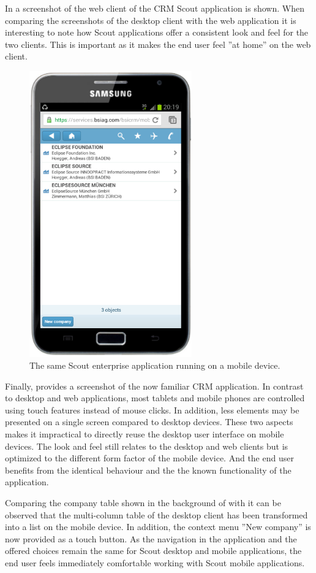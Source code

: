 \documentclass[a4paper,10pt,twoside]{book}
\begin{document}
In  a screenshot of the web client of the CRM Scout application is shown. 
When comparing the screenshots of the desktop client with the web application it is interesting to note how Scout applications offer a consistent look and feel for the two clients. 
This is important as it makes the end user feel ''at home'' on the web client. 

\begin{figure}
\includegraphics[width=7cm]{bsi_crm_mobile_galaxy.png}
\caption{The same Scout enterprise application running on a mobile device.}
\end{figure}

Finally,  provides a screenshot of the now familiar CRM application. 
In contrast to desktop and web applications, most tablets and mobile phones are controlled using touch features instead of mouse clicks.
In addition, less elements may be presented on a single screen compared to desktop devices.
These two aspects makes it impractical to directly reuse the desktop user interface on mobile devices.
The look and feel still relates to the desktop and web clients but is optimized to the different form factor of the mobile device. 
And the end user benefits from the identical behaviour and the the known functionality of the application.

Comparing the company table shown in the background of  with  it can be observed that the multi-column table of the desktop client has been transformed into a list on the mobile device. 
In addition, the context menu ''New company'' is now provided as a touch button.
As the navigation in the application and the offered choices remain the same for Scout desktop and mobile applications, the end user feels immediately comfortable working with Scout mobile applications.
\end{document}
